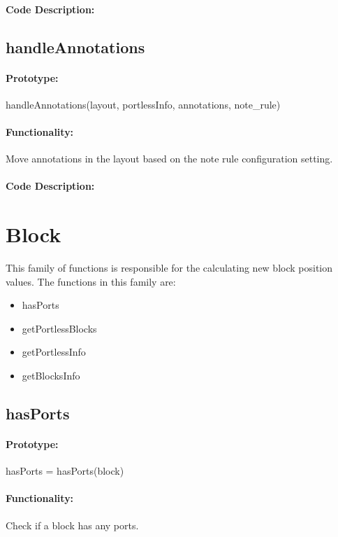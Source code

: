 \documentclass[12pt,letterpaper]{report}
\begin{document}
\paragraph{Code Description:}

\subsection{handleAnnotations}
\paragraph{Prototype:} handleAnnotations(layout, portlessInfo, annotations, note\_rule)
\paragraph{Functionality:} Move annotations in the layout based on the note rule configuration setting.
\paragraph{Code Description:}

\section{Block}
\par This family of functions is responsible for the calculating new block position values. The functions in this family are:
\begin{itemize}
	\item hasPorts
	\item getPortlessBlocks
	\item getPortlessInfo
	\item getBlocksInfo
\end{itemize}

\subsection{hasPorts}
\paragraph{Prototype:} hasPorts = hasPorts(block)
\paragraph{Functionality:} Check if a block has any ports.
\end{document}
